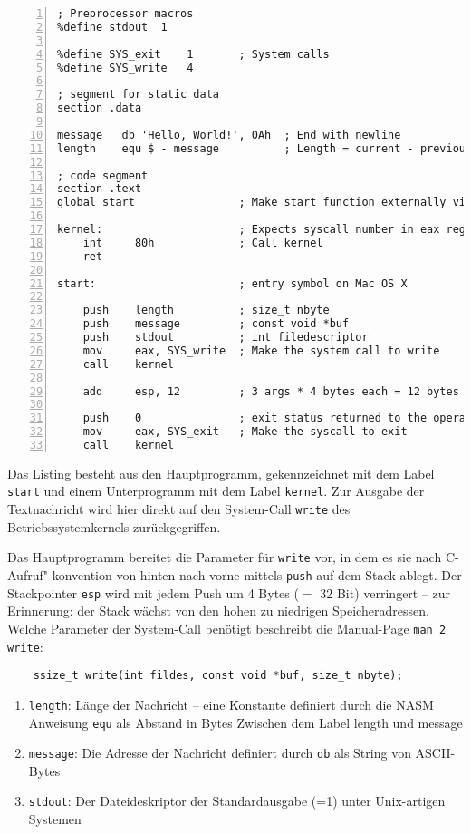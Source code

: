 \begin{lstlisting}[numbers=left,caption=hello.asm]
; Preprocessor macros
%define stdout  1

%define SYS_exit    1       ; System calls
%define SYS_write   4

; segment for static data
section .data

message   db 'Hello, World!', 0Ah  ; End with newline
length    equ $ - message          ; Length = current - previous address

; code segment
section .text
global start                ; Make start function externally visible for linker

kernel:                     ; Expects syscall number in eax register
    int     80h             ; Call kernel
    ret

start:                      ; entry symbol on Mac OS X

    push    length          ; size_t nbyte
    push    message         ; const void *buf
    push    stdout          ; int filedescriptor
    mov     eax, SYS_write  ; Make the system call to write
    call    kernel

    add     esp, 12         ; 3 args * 4 bytes each = 12 bytes

    push    0               ; exit status returned to the operating system
    mov     eax, SYS_exit   ; Make the syscall to exit
    call    kernel
\end{lstlisting}

Das Listing besteht aus den Hauptprogramm, gekennzeichnet mit dem Label \texttt{start} und einem Unterprogramm mit dem Label \texttt{kernel}. Zur Ausgabe der Textnachricht wird hier direkt auf den System-Call \texttt{write} des Betriebssystemkernels zurückgegriffen.

Das Hauptprogramm bereitet die Parameter für {\tt write} vor, in dem es sie nach C-Aufruf"-konvention von hinten nach vorne mittels {\tt push} auf dem Stack ablegt. Der Stackpointer {\tt esp} wird mit jedem Push um 4 Bytes ($=$ 32 Bit) verringert -- zur Erinnerung: der Stack wächst von den hohen zu niedrigen Speicheradressen. Welche Parameter der System-Call benötigt beschreibt die Manual-Page {\tt man 2 write}:

\begin{lstlisting}
    ssize_t write(int fildes, const void *buf, size_t nbyte);
\end{lstlisting}

\begin{enumerate}
\item {\tt length}: Länge der Nachricht – eine Konstante definiert durch die
NASM Anweisung {\tt equ} als Abstand in Bytes Zwischen dem Label length und message
\item {\tt message}: Die Adresse der Nachricht definiert durch {\tt db} als String von ASCII-Bytes
\item {\tt stdout}: Der Dateideskriptor der Standardausgabe (=1) unter Unix-artigen Systemen
\end{enumerate}

